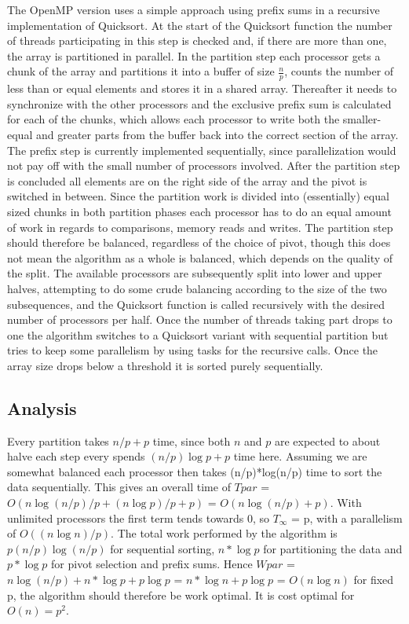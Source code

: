 \documentclass[12pt,a4paper]{article}
\begin{document}
The OpenMP version uses a simple approach using prefix sums in a recursive implementation of Quicksort.
At the start of the Quicksort function the number of threads participating in this step is checked and, if there are more than one, the array is partitioned in parallel.
In the partition step each processor gets a chunk of the array and partitions it into a buffer of size $\frac{n}{p}$, counts the number of less than or equal elements and stores it in a shared array. Thereafter it needs to synchronize with the other processors and the exclusive prefix sum is calculated for each of the chunks, which allows each processor to write both the smaller-equal and greater parts from the buffer back into the correct section of the array.
The prefix step is currently implemented sequentially, since parallelization would not pay off with the small number of processors involved.
After the partition step is concluded all elements are on the right side of the array and the pivot is switched in between.  Since the partition work is divided into (essentially) equal sized chunks in both partition phases each processor has to do an equal amount of work in regards to comparisons, memory reads and writes. The partition step should therefore be balanced, regardless of the choice of pivot, though this does not mean the algorithm as a whole is balanced, which depends on the quality of the split.
The available processors are subsequently split into lower and upper halves, attempting to do some crude balancing according to the size of the two subsequences, and the Quicksort function is called recursively with the desired number of processors per half.
Once the number of threads taking part drops to one the algorithm switches to a Quicksort variant with sequential partition but tries to keep some parallelism by using tasks for the recursive calls. Once the array size drops below a threshold it is sorted purely sequentially.

\subsection{Analysis}
Every partition takes $n/p + p$ time, since both $n$ and $p$ are expected to about halve each step every spends $(n/p)\log p + p$ time here. Assuming we are somewhat balanced each processor then takes (n/p)*log(n/p) time to sort the data sequentially. This gives an overall time of $Tpar$ = $O(n\log (n/p)/p + (n\log p)/p + p)$ = $O(n\log (n/p) + p)$. With unlimited processors the first term tends towards 0, so $T_{\infty}$ = p, with a parallelism of $O((n\log n)/p)$. 
The total work performed by the algorithm is $p(n/p)\log(n/p)$ for sequential sorting, $n*\log p$ for partitioning the data and $p*\log p$ for pivot selection and prefix sums. Hence $Wpar$ = $n\log(n/p) + n*\log p + p\log p$ = $n*\log n + p\log p$ = $O(n\log n)$ for fixed p, the algorithm should therefore be work optimal. It is cost optimal for $O(n) = p^2$.
\end{document}
